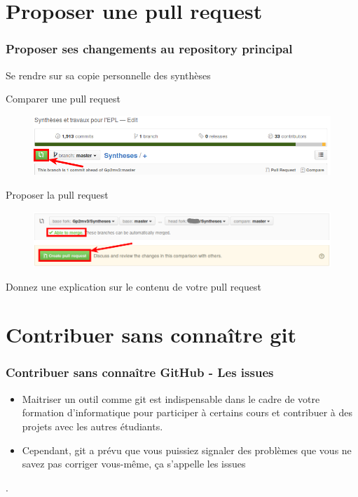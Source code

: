 \documentclass{beamer}
\newenvironment{wideitemize}{\itemize\addtolength{\itemsep}{10pt}}{\enditemize}
\begin{document}
\section{Proposer une pull request}

\begin{frame}
    \frametitle{Proposer ses changements au repository principal}
    \begin{wideitemize}
        \item Se rendre sur sa copie personnelle des synthèses
        \pause
        \item Comparer une pull request
            \begin{figure}[H]
                \centering
                \includegraphics[width=\linewidth]{pull_request.png}
            \end{figure}
         \pause
         \item Proposer la pull request
            \begin{figure}[H]
                \centering
                \includegraphics[width=\linewidth]{create_pull_request.png}
            \end{figure}
         \pause
         \item Donnez une explication sur le contenu de votre pull request
     \end{wideitemize}
\end{frame}

\section{Contribuer sans connaître git}

\begin{frame}
    \frametitle{Contribuer sans connaître GitHub - Les issues}
    \begin{itemize}
        \item Maitriser un outil comme git est indispensable dans le
            cadre de votre formation d'informatique pour participer à
            certains cours et contribuer à des projets avec les autres
            étudiants.
        \item Cependant, git a prévu que vous puissiez signaler des
            problèmes que vous ne savez pas corriger vous-même, ça
            s'appelle les issues
    \end{itemize}
\end{frame}.
\end{document}
